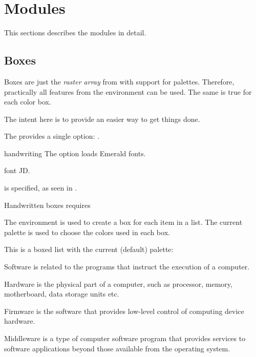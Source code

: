 \documentclass[a4paper, 11pt]{article}
\begin{document}
\section{Modules}

This sections describes the modules in detail.

\subsection{Boxes}\label{sec:boxes}

Boxes are just the \textit{raster array} from  with support for palettes. Therefore, practically all features from the  environment can be used. The same is true for each color box.

The intent here is to provide an easier way to get things done.

The  provides a single option: .

\begin{option}{handwriting}{}
    The option  loads Emerald fonts.

     font JD\footnotemark.

    is specified, as seen in .

    Handwritten boxes requires
\end{option}

The environment  is used to create a box for each item in a list. The current palette is used to choose the colors used in each box.

\begin{example}{}
    This is a boxed list with the current (default) palette:

    \begin{PLTBoxRaster}
        \item Software is related to the programs that instruct the execution of a computer.
        \item Hardware is the physical part of a computer, such as processor, memory, motherboard, data storage units etc.
        \item Firmware is the software that provides low-level control of computing device hardware.
        \item Middleware is a type of computer software program that provides services to software applications beyond those available from the operating system.
    \end{PLTBoxRaster}
\end{example}
\end{document}
